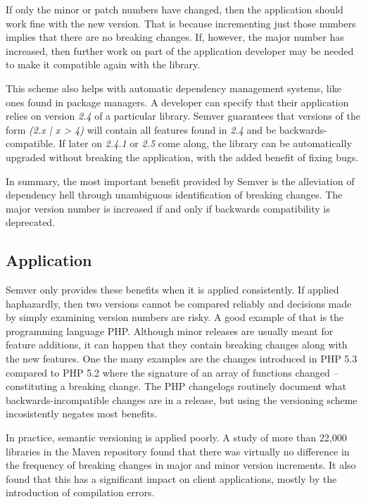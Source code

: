 \documentclass{l4proj}
\begin{document}
If only the minor or patch numbers have changed, then the application
should work fine with the new version. That is because incrementing
just those numbers implies that there are no breaking changes. If,
however, the major number has increased, then further work on part of
the application developer may be needed to make it compatible again
with the library.

This scheme also helps with automatic dependency management systems,
like ones found in package managers. A developer can specify that
their application relies on version \textit{2.4} of a particular
library. Semver guarantees that versions of the form \textit{(2.x | x
> 4)} will contain all features found in \textit{2.4} and be
backwards-compatible. If later on \textit{2.4.1} or \textit{2.5} come
along, the library can be automatically upgraded without breaking the
application, with the added benefit of fixing bugs.

In summary, the most important benefit provided by Semver is the
alleviation of dependency hell through unambiguous identification of
breaking changes. The major version number is increased if and only if
backwards compatibility is deprecated.

\subsection{Application}

Semver only provides these benefits when it is applied consistently.
If applied haphazardly, then two versions cannot be compared
reliably and decisions made by simply examining version numbers are
risky. A good example of that is the programming language PHP.
Although minor releases are usually meant for feature additions, it
can happen that they contain breaking changes along with the new
features. One the many examples are the changes introduced in PHP 5.3
compared to PHP 5.2\cite{PHPChangelog} where the signature of an array
of functions changed -- constituting a breaking change. The PHP
changelogs routinely document what backwards-incompatible changes are
in a release, but using the versioning scheme incosistently negates
most benefits.

In practice, semantic versioning is applied poorly. A
study\cite{SemverMaven} of more than 22,000 libraries in the Maven
repository found that there was virtually no difference in the
frequency of breaking changes in major and minor version increments.
It also found that this has a significant impact on client
applications, mostly by the introduction of compilation errors.
\end{document}
